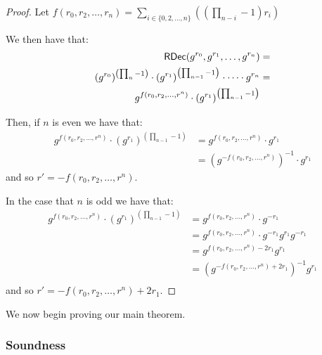 \begin{proof}
	Let $f(r_0, r_2, \dots, r_n) = \sum_{i \in \{0, 2, \dots, n\}}((\prod_{n - i} -1)r_i) $

	We then have that:
	\begin{align*}
		\mathsf{RDec}(g^{r_0}, g^{r_1},\dots,g^{r_n})                                                                      & = \\
		(g^{r_0})^{\left(\prod_n-1\right)}\cdot (g^{r_1})^{\left(\prod_{n - 1}-1\right)} \cdot \dots \cdot g^{r_n} & = \\
		g^{f(r_0, r_2, \dots, r^n)} \cdot (g^{r_1})^{\left(\prod_{n - 1}-1\right)}
	\end{align*}

	Then, if $n$ is even we have that:
	\begin{align*}
		g^{f(r_0, r_2, \dots, r^n)} \cdot (g^{r_1})^{\left(\prod_{n - 1}-1\right)} & = g^{f(r_0, r_2, \dots, r^n)} \cdot g^{r_1}         \\
		                                                                           & = (g^{-f(r_0, r_2, \dots, r^n)})^{-1} \cdot g^{r_1}
	\end{align*}
	and so $r' = -f(r_0, r_2, \dots, r^n)$.

	In the case that $n$ is odd we have that:
	\begin{align*}
		g^{f(r_0, r_2, \dots, r^n)} \cdot (g^{r_1})^{\left(\prod_{n - 1}-1\right)} & = g^{f(r_0, r_2, \dots, r^n)} \cdot g^{-r_1}                  \\
		                                                                           & = g^{f(r_0, r_2, \dots, r^n)} \cdot g^{-r_1} g^{r_1} g^{-r_1} \\
		                                                                           & = g^{f(r_0, r_2, \dots, r^n) - 2r_1} g^{r_1}                  \\
		                                                                           & = (g^{-f(r_0, r_2, \dots, r^n) + 2r_1})^{-1} g^{r_1}          \\
	\end{align*}
	and so $r' = -f(r_0, r_2, \dots, r^n) + 2r_1$.
\end{proof}

We now begin proving our main theorem.

\subsubsection{Soundness}

